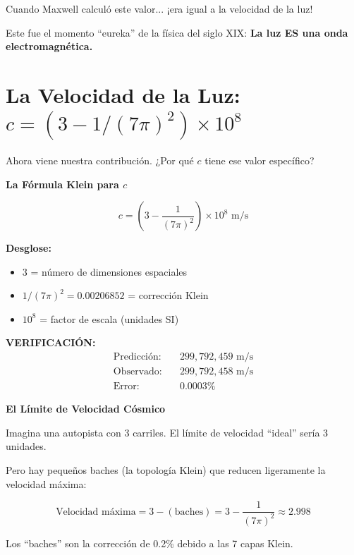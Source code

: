 Cuando Maxwell calculó este valor... ¡era igual a la velocidad de la luz!

Este fue el momento ``eureka'' de la física del siglo XIX:
\textbf{La luz ES una onda electromagnética.}


\section{La Velocidad de la Luz: $c = (3 - 1/(7\pi)^2) \times 10^8$}

Ahora viene nuestra contribución. ¿Por qué $c$ tiene ese valor específico?

\begin{nivelconceptual}
\textbf{La Fórmula Klein para $c$}

\begin{equation}
\boxed{c = \left(3 - \frac{1}{(7\pi)^2}\right) \times 10^8 \text{ m/s}}
\end{equation}

\textbf{Desglose:}
\begin{itemize}
    \item $3$ = número de dimensiones espaciales
    \item $1/(7\pi)^2 = 0.00206852$ = corrección Klein
    \item $10^8$ = factor de escala (unidades SI)
\end{itemize}

\textbf{VERIFICACIÓN:}
\begin{align}
\text{Predicción:} & \quad 299,792,459 \text{ m/s}\\
\text{Observado:} & \quad 299,792,458 \text{ m/s}\\
\text{Error:} & \quad 0.0003\%
\end{align}
\end{nivelconceptual}

\begin{analogiabox}
\textbf{El Límite de Velocidad Cósmico}

Imagina una autopista con 3 carriles.
El límite de velocidad ``ideal'' sería 3 unidades.

Pero hay pequeños baches (la topología Klein) que reducen
ligeramente la velocidad máxima:

\begin{equation}
\text{Velocidad máxima} = 3 - (\text{baches}) = 3 - \frac{1}{(7\pi)^2} \approx 2.998
\end{equation}

Los ``baches'' son la corrección de 0.2\% debido a las 7 capas Klein.
\end{analogiabox}

